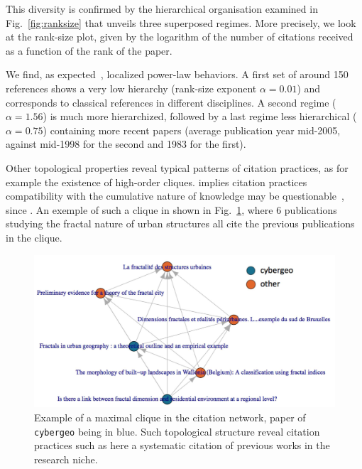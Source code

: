 This diversity is confirmed by the hierarchical organisation examined in Fig.~\ref{fig:ranksize} that unveils three superposed regimes. More precisely, we look at the rank-size plot, given by the logarithm of the number of citations received as a function of the rank of the paper. 

We find, as expected~\citep{redner1998popular}, localized power-law behaviors. A first set of around 150 references shows a very low hierarchy (rank-size exponent $\alpha = 0.01$) and corresponds to classical references in different disciplines. A second regime ($\alpha = 1.56$) is much more hierarchized, followed by a last regime less hierarchical ($\alpha = 0.75$) containing more recent papers (average publication year mid-2005, against mid-1998 for the second and 1983 for the first).



Other topological properties reveal typical patterns of citation practices, as for example the existence of high-order cliques.   implies citation practices   compatibility  with the cumulative nature of knowledge may be questionable~\citep{pumain2005cumulativite}, since . An exemple of such a clique in shown in Fig.~\ref{fig:cliques}, where 6 publications studying the fractal nature of urban structures all cite the previous publications in the clique.



\begin{figure}
\includegraphics[width=\textwidth]{figures/Fig4.jpg}
\caption{Example of a maximal clique in the citation network, paper of \texttt{cybergeo} being in blue. Such topological structure reveal citation practices such as here a systematic citation of previous works in the research niche.}
\label{fig:cliques}
\end{figure}



